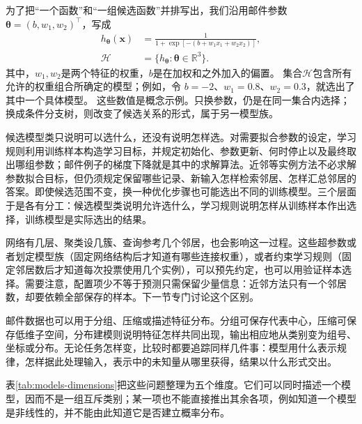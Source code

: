 为了把“一个函数”和“一组候选函数”并排写出，我们沿用邮件参数$\bm{\theta}=(b,w_1,w_2)^{\top}$，写成
\begin{equation}
  \begin{aligned}
    h_{\bm{\theta}}(\bm{x})
      &=\frac{1}{1+\exp[-(b+w_1x_1+w_2x_2)]},\\
    \mathcal{H}&=\{h_{\bm{\theta}}:\bm{\theta}\in\mathbb{R}^{3}\}.
  \end{aligned}
  \label{eq:models-family-example}
\end{equation}
其中，$w_1,w_2$是两个特征的权重，$b$是在加权和之外加入的偏置。
集合$\mathcal{H}$包含所有允许的权重组合所确定的模型；例如，令
$b=-2$、$w_1=0.8$、$w_2=0.3$，就选出了其中一个具体模型。
这些数值是概念示例。只换参数，仍是在同一集合内选择；换成条件分支树，则改变了候选关系的形式，属于另一模型族。

候选模型类只说明可以选什么，还没有说明怎样选。对需要拟合参数的设定，学习规则利用训练样本构造学习目标，并规定初始化、参数更新、何时停止以及最终取出哪组参数；邮件例子的梯度下降就是其中的求解算法。近邻等实例方法不必求解参数拟合目标，但仍须规定保留哪些记录、新输入怎样检索邻居、怎样汇总邻居的答案。即使候选范围不变，换一种优化步骤也可能选出不同的训练模型。三个层面于是各有分工：候选模型类说明允许选什么，学习规则说明怎样从训练样本作出选择，训练模型是实际选出的结果。

网络有几层、聚类设几簇、查询参考几个邻居，也会影响这一过程。这些超参数或者划定模型族（固定网络结构后才知道有哪些连接权重），或者约束学习规则（固定邻居数后才知道每次投票使用几个实例），可以预先约定，也可以用验证样本选择。需要注意，配置项少不等于预测只需保留少量信息：近邻方法只有一个邻居数，却要依赖全部保存的样本。下一节专门讨论这个区别。

邮件数据也可以用于分组、压缩或描述特征分布。分组可保存代表中心，压缩可保存低维子空间，分布建模则说明特征怎样共同出现，输出相应地从类别变为组号、坐标或分布。无论任务怎样变，比较时都要追踪同样几件事：模型用什么表示规律，怎样据此处理输入，表示中的未知量从哪里获得，结果以什么形式交出。

表\ref{tab:models-dimensions}把这些问题整理为五个维度。它们可以同时描述一个模型，因而不是一组互斥类别；某一项也不能直接推出其余各项，例如知道一个模型是非线性的，并不能由此知道它是否建立概率分布。

